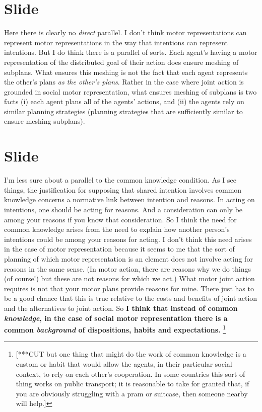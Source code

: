 \documentclass[12pt,\papersize]{extarticle}
\begin{document}
\section{Slide}
Here there is clearly no \emph{direct} parallel. 
I don’t think motor representations can represent motor representations in the way that intentions can represent intentions.
But I do think there is a parallel of sorts.
Each agent’s having a motor representation of the distributed goal of their action does ensure meshing of subplans.
What ensures this meshing is not the fact that each agent represents the other's plans \emph{as the other's plans}.
Rather in the case where joint action is grounded in social motor representation, what ensures meshing of subplans is two facts (i) each agent plans all of the agents’ actions, and (ii) the agents rely on similar planning strategies (planning strategies that are sufficiently similar to ensure meshing subplans).


\section{Slide}
I’m less sure about a parallel to the common knowledge condition.
As I see things, the justification for supposing that shared intention involves common knowledge concerns a normative link between intention and reasons.
In acting on intentions, one should be acting for reasons.
And a consideration can only be among your reasons if you know that consideration.
So I think the need for common knowledge arises from the need to explain how another person’s intentions could be among your reasons for acting.
I don’t think this need arises in the case of motor representation because it seems to me that the sort of planning of which motor representation is an element does not involve acting for reasons in the same sense.  
(In motor action, there are reasons why we do things (of course!) but these are not  reasons for which we act.)
What motor joint action requires is not that your motor plans provide reasons for mine.
There just has to be a good chance that this is true relative to the costs and benefits of joint action and the alternatives to joint action.
So \textbf{I think that instead of common \emph{knowledge}, in the case of social motor representation there is a common \emph{background} of dispositions, habits and expectations.}%
\footnote{
[***CUT but one thing that might do the work of common knowledge is a custom or habit 
that would allow the agents, in their particular social context, to rely on each other’s cooperation.
In some countries this sort of thing works on public transport; 
it is reasonable to take for granted that, if you are obviously struggling with a pram or suitcase, then someone nearby will help.]
}
\end{document}
